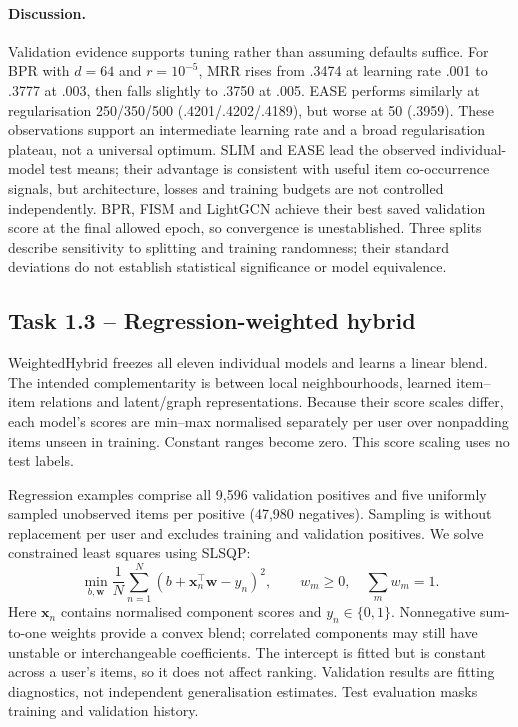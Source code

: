 \documentclass[12pt,a4paper]{article}   %
\begin{document}
\paragraph{Discussion.}
Validation evidence supports tuning rather than assuming defaults suffice. For BPR with $d=64$ and $r=10^{-5}$, MRR rises from .3474 at learning rate .001 to .3777 at .003, then falls slightly to .3750 at .005. EASE performs similarly at regularisation 250/350/500 (.4201/.4202/.4189), but worse at 50 (.3959). These observations support an intermediate learning rate and a broad regularisation plateau, not a universal optimum. SLIM and EASE lead the observed individual-model test means; their advantage is consistent with useful item co-occurrence signals, but architecture, losses and training budgets are not controlled independently. BPR, FISM and LightGCN achieve their best saved validation score at the final allowed epoch, so convergence is unestablished. Three splits describe sensitivity to splitting and training randomness; their standard deviations do not establish statistical significance or model equivalence.

\clearpage
\subsection{Task 1.3 -- Regression-weighted hybrid}

WeightedHybrid freezes all eleven individual models and learns a linear blend. The intended complementarity is between local neighbourhoods, learned item--item relations and latent/graph representations. Because their score scales differ, each model's scores are min--max normalised separately per user over nonpadding items unseen in training. Constant ranges become zero. This score scaling uses no test labels.

Regression examples comprise all 9,596 validation positives and five uniformly sampled unobserved items per positive (47,980 negatives). Sampling is without replacement per user and excludes training and validation positives. We solve constrained least squares using SLSQP:
\[
\min_{b,\mathbf{w}}\frac{1}{N}\sum_{n=1}^{N}
\left(b+\mathbf{x}_{n}^{\top}\mathbf{w}-y_n\right)^2,
\qquad w_m\geq0,\quad\sum_m w_m=1.
\]
Here $\mathbf{x}_n$ contains normalised component scores and $y_n\in\{0,1\}$. Nonnegative sum-to-one weights provide a convex blend; correlated components may still have unstable or interchangeable coefficients. The intercept is fitted but is constant across a user's items, so it does not affect ranking. Validation results are fitting diagnostics, not independent generalisation estimates. Test evaluation masks training and validation history.
\end{document}
